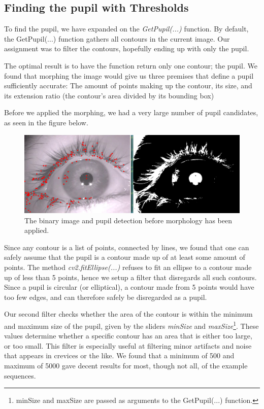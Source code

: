 \subsection{Finding the pupil with Thresholds}
To find the pupil, we have expanded on the \emph{GetPupil(...)} function.\newline
By default, the GetPupil(...) function gathers all contours in the current image. Our assignment was to filter the contours, hopefully ending up with only the pupil.\newline

The optimal result is to have the function return only one contour; the pupil. We found that morphing the image would give us three premises that define a pupil sufficiently accurate: The amount of points making up the contour, its size, and its extension ratio (the contour's area divided by its bounding box)\newline

Before we applied the morphing, we had a very large number of pupil candidates, as seen in the figure below.\newline

\begin{figure}[h]
	\centering
	\includegraphics[scale=0.35]{many_pupils.png}
	\caption{The binary image and pupil detection before morphology has been applied.}
\end{figure}

Since any contour is a list of points, connected by lines, we found that one can safely assume that the pupil is a contour made up of at least some amount of points. The method \emph{cv2.fitEllipse(...)} refuses to fit an ellipse to a contour made up of less than 5 points, hence we setup a filter that disregards all such contours. Since a pupil is circular (or elliptical), a contour made from 5 points would have too few edges, and can therefore safely be disregarded as a pupil.\newline

Our second filter checks whether the area of the contour is within the minimum and maximum size of the pupil, given by the sliders \emph{minSize} and \emph{maxSize}\footnote{minSize and maxSize are passed as arguments to the GetPupil(...) function.}. These values determine whether a specific contour has an area that is either too large, or too small. This filter is especially useful at filtering minor artifacts and noise that appears in crevices or the like. We found that a minimum of 500 and maximum of 5000 gave decent results for most, though not all, of the example sequences. \newline

